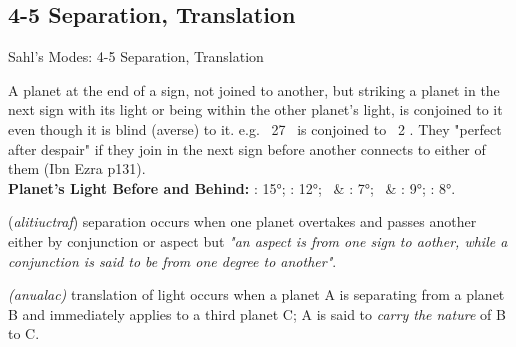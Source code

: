 \subsection{4-5 Separation, Translation}
\begin{frame}[t]{Sahl's Modes: 4-5 Separation, Translation}
\begin{description}[style=nextline]
\item[3. Connection Cont'd] A planet at the end of a sign, not joined to another, but striking a planet in the next sign with its light or being within the other planet's light, is conjoined to it even though it is blind (averse) to it\footnotemark[1]. e.g. \Moon\ 27 \Aries\ is conjoined to \Venus\ 2 \Taurus. They "perfect after despair" if they join in the next sign before another connects to either of them (Ibn Ezra p131). \\
\vspace{1em}
\textbf{Planet's Light Before and Behind:} \Sun: 15°; \Moon: 12°; \Venus\ \& \Mercury: 7°; \Jupiter\ \& \Saturn: 9°; \Mars: 8°. \\

\item[4. Separation] (\textsl{alitiuctraf}) separation occurs when one planet overtakes and passes another either by conjunction or aspect but \textsl{"an aspect is from one sign to aother, while a conjunction is said to be from one degree to another"}. \\

\item[5. Translation] \textsl{(anualac)} translation of light occurs when a planet A is separating from a planet B and immediately applies to a third planet C; A is said to \textsl{carry the nature} of B to C. 
\end{description}

\end{frame}

